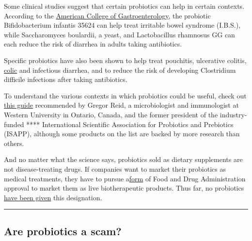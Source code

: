 Some clinical studies suggest that certain probiotics can help in
certain contexts. According to the
\href{https://gi.org/topics/probiotics-for-the-treatment-of-adult-gastrointestinal-disorders/}{American
College of Gastroenterology}, the probiotic Bifidobacterium infantis
35624 can help treat irritable bowel syndrome (I.B.S.), while
Saccharomyces boulardii, a yeast, and Lactobacillus rhamnosus GG can
each reduce the risk of diarrhea in adults taking antibiotics.

Specific probiotics have also been shown to help treat pouchitis,
ulcerative colitis,
\href{https://www.cochrane.org/CD012473/BEHAV_probiotics-prevent-infantile-colic}{colic}
and infectious diarrhea, and to reduce the risk of developing
Clostridium difficile infections after taking antibiotics.

To understand the various contexts in which probiotics could be useful,
check out
\href{http://www.usprobioticguide.com/PBCIntroduction.html?utm_source=intro_pg\&utm_medium=civ\&utm_campaign=USA_CHART}{this
guide} recommended by Gregor Reid, a microbiologist and immunologist at
Western University in Ontario, Canada, and the former president of the
industry-funded **** International Scientific Association for Probiotics
and Prebiotics (ISAPP), although some products on the list are backed by
more research than others.

And no matter what the science says, probiotics sold as dietary
supplements are not disease-treating drugs. If companies want to market
their probiotics as medical treatments, they have to pursue
a\href{https://www.fda.gov/regulatory-information/search-fda-guidance-documents/early-clinical-trials-live-biotherapeutic-products-chemistry-manufacturing-and-control-information}{form}
of Food and Drug Administration approval to market them as live
biotherapeutic products. Thus far, no probiotics
\href{https://www.fda.gov/news-events/press-announcements/statement-fda-commissioner-scott-gottlieb-md-advancing-science-and-regulation-live-microbiome-based}{have
been given} this designation.

\begin{center}\rule{0.5\linewidth}{\linethickness}\end{center}

\hypertarget{are-probiotics-a-scam}{%
\subsection{Are probiotics a scam?}\label{are-probiotics-a-scam}}

